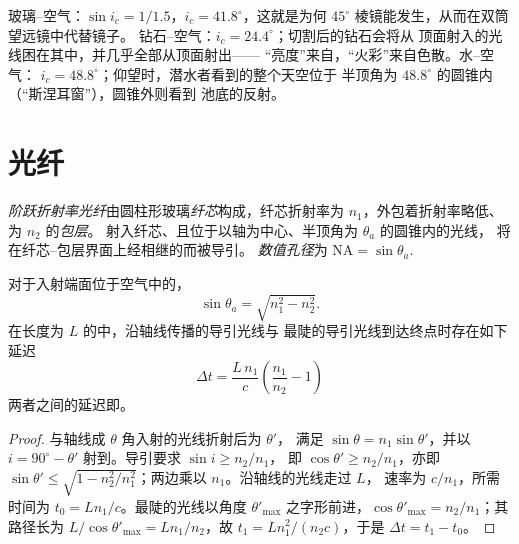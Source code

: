 \begin{example}[钻石与游泳者]\label{ex:b1:rays-reflection-refraction:tir}
玻璃–空气：$\sin i_c = 1/1.5$，$i_c = 41.8^\circ$，这就是为何
$45^\circ$ 棱镜能发生，从而在双筒望远镜中代替镜子。
钻石–空气：$i_c = 24.4^\circ$；切割后的钻石会将从
顶面射入的光线困在其中，并几乎全部从顶面射出——
“亮度”来自，“火彩”来自色散。水–空气：
$i_c = 48.8^\circ$；仰望时，潜水者看到的整个天空位于
半顶角为 $48.8^\circ$ 的圆锥内（“斯涅耳窗”），圆锥外则看到
池底的反射。
\end{example}

\section{光纤}

\begin{definition}[阶跃折射率光纤]\label{def:b1:rays-reflection-refraction:fiber}
\emph{阶跃折射率光纤}由圆柱形玻璃\emph{纤芯}构成，纤芯折射率为
$n_1$，外包着折射率略低、为 $n_2$ 的\emph{包层}。
射入纤芯、且位于以轴为中心、半顶角为 $\theta_a$ 的圆锥内的光线，
将在纤芯–包层界面上经相继的而被导引。
\emph{数值孔径}为
$\mathrm{NA} = \sin\theta_a$.
\end{definition}

\begin{proposition}[接收锥与模间色散]\label{prop:b1:rays-reflection-refraction:fiber}
对于入射端面位于空气中的，
\[
\sin\theta_a = \sqrt{n_1^2 - n_2^2} .
\]
在长度为 $L$ 的中，沿轴线传播的导引光线与
最陡的导引光线到达终点时存在如下延迟
\[
\Delta t = \frac{L\,n_1}{c}\left(\frac{n_1}{n_2} - 1\right)
\]
两者之间的延迟即\emph{}。
\end{proposition}

\begin{proof}
与轴线成 $\theta$ 角入射的光线折射后为 $\theta'$，
满足 $\sin\theta = n_1\sin\theta'$，并以
$i = 90^\circ - \theta'$ 射到。导引要求 $\sin i \geq n_2/n_1$，
即 $\cos\theta' \geq n_2/n_1$，亦即 $\sin\theta' \leq
\sqrt{1 - n_2^2/n_1^2}$；两边乘以 $n_1$。沿轴线的光线走过 $L$，
速率为 $c/n_1$，所需时间为 $t_0 = Ln_1/c$。最陡的光线以角度
$\theta'_{\max}$ 之字形前进，$\cos\theta'_{\max} = n_2/n_1$；其路径长为
$L/\cos\theta'_{\max} = L n_1/n_2$，故 $t_1 = L n_1^2/(n_2 c)$，于是
$\Delta t = t_1 - t_0$。
\end{proof}

